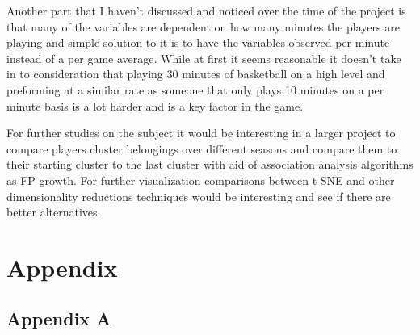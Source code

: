 \documentclass{article}
\begin{document}
Another part that I haven’t discussed and noticed over the time of the project is that many of the variables are dependent on how many minutes the players are playing and simple solution to it is to have the variables observed per minute instead of a per game average. While at first it seems reasonable it doesn't take in to consideration that playing 30 minutes of basketball on a high level and preforming at a similar rate as someone that only plays 10 minutes on a per minute basis is a lot harder and is a key factor in the game.

For further studies on the subject it would be interesting in a larger project to compare players cluster belongings over different seasons and compare them to their starting cluster to the last cluster with aid of association analysis algorithms as FP-growth. For further visualization comparisons between t-SNE and other dimensionality reductions techniques would be interesting and see if there are better alternatives.







\newpage

\section{Appendix}
\subsection{Appendix A}
\end{document}
